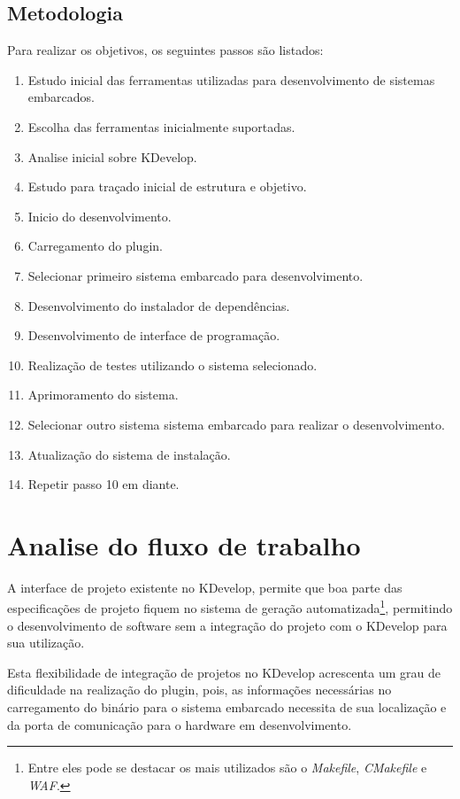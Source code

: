 \subsection{Metodologia}
\label{ss:objetivosespecificos}
Para realizar os objetivos, os seguintes passos são listados:
\begin{enumerate}
\item Estudo inicial das ferramentas utilizadas para desenvolvimento de sistemas embarcados.
\item Escolha das ferramentas inicialmente suportadas.
\item Analise inicial sobre KDevelop.
\item Estudo para traçado inicial de estrutura e objetivo.
\item Inicio do desenvolvimento.
\item Carregamento do plugin.
\item Selecionar primeiro sistema embarcado para desenvolvimento.
\item Desenvolvimento do instalador de dependências.
\item Desenvolvimento de interface de programação.
\item Realização de testes utilizando o sistema selecionado.
\item Aprimoramento do sistema.
\item Selecionar outro sistema sistema embarcado para realizar o desenvolvimento.
\item Atualização do sistema de instalação.
\item Repetir passo 10 em diante.
\end{enumerate}

\section{Analise do fluxo de trabalho}

A interface de projeto existente no KDevelop, permite que boa parte das especificações de projeto fiquem no sistema de geração automatizada\footnote{Entre eles pode se destacar os mais utilizados são o \textit{Makefile}, \textit{CMakefile} e \textit{WAF}.}, permitindo o desenvolvimento de software sem a integração do projeto com o KDevelop para sua utilização.
\iffalse
, utilizando arquivos intermediários de configuração\footnote{Arquivos que contem informações sobre compilador, estilo de código, execução e etc.}.
\fi
Esta flexibilidade de integração de projetos no KDevelop acrescenta um grau de dificuldade na realização do plugin, pois, as informações necessárias no carregamento do binário para o sistema embarcado necessita de sua localização e da porta de comunicação para o hardware em desenvolvimento. %

